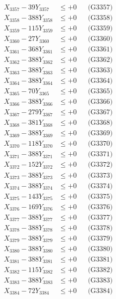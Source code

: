 \documentclass[a4paper,10pt]{article}
\begin{document}
{\begin{align}
X_{3357} - 39Y_{3357} &\leq +0 && \text{(G3357)} \\
X_{3358} - 388Y_{3358} &\leq +0 && \text{(G3358)} \\
X_{3359} - 115Y_{3359} &\leq +0 && \text{(G3359)} \\
X_{3360} - 27Y_{3360} &\leq +0 && \text{(G3360)} \\
\allowbreak
X_{3361} - 368Y_{3361} &\leq +0 && \text{(G3361)} \\
X_{3362} - 388Y_{3362} &\leq +0 && \text{(G3362)} \\
X_{3363} - 388Y_{3363} &\leq +0 && \text{(G3363)} \\
X_{3364} - 388Y_{3364} &\leq +0 && \text{(G3364)} \\
X_{3365} - 70Y_{3365} &\leq +0 && \text{(G3365)} \\
X_{3366} - 388Y_{3366} &\leq +0 && \text{(G3366)} \\
X_{3367} - 279Y_{3367} &\leq +0 && \text{(G3367)} \\
X_{3368} - 381Y_{3368} &\leq +0 && \text{(G3368)} \\
X_{3369} - 388Y_{3369} &\leq +0 && \text{(G3369)} \\
X_{3370} - 118Y_{3370} &\leq +0 && \text{(G3370)} \\
\allowbreak
X_{3371} - 388Y_{3371} &\leq +0 && \text{(G3371)} \\
X_{3372} - 152Y_{3372} &\leq +0 && \text{(G3372)} \\
X_{3373} - 388Y_{3373} &\leq +0 && \text{(G3373)} \\
X_{3374} - 388Y_{3374} &\leq +0 && \text{(G3374)} \\
X_{3375} - 143Y_{3375} &\leq +0 && \text{(G3375)} \\
X_{3376} - 169Y_{3376} &\leq +0 && \text{(G3376)} \\
X_{3377} - 388Y_{3377} &\leq +0 && \text{(G3377)} \\
X_{3378} - 388Y_{3378} &\leq +0 && \text{(G3378)} \\
X_{3379} - 388Y_{3379} &\leq +0 && \text{(G3379)} \\
X_{3380} - 388Y_{3380} &\leq +0 && \text{(G3380)} \\
\allowbreak
X_{3381} - 388Y_{3381} &\leq +0 && \text{(G3381)} \\
X_{3382} - 115Y_{3382} &\leq +0 && \text{(G3382)} \\
X_{3383} - 388Y_{3383} &\leq +0 && \text{(G3383)} \\
X_{3384} - 72Y_{3384} &\leq +0 && \text{(G3384)} \\

\end{align}}
\end{document}
